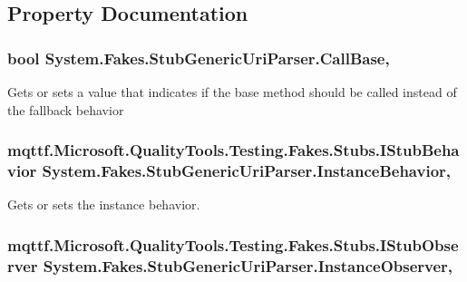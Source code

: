 \subsection{Property Documentation}
\hypertarget{class_system_1_1_fakes_1_1_stub_generic_uri_parser_a0331b76f773aca83c556dba9250e125d}{
\subsubsection[{Call\-Base}]{\setlength{\rightskip}{0pt plus 5cm}bool System.\-Fakes.\-Stub\-Generic\-Uri\-Parser.\-Call\-Base\hspace{0.3cm}{\ttfamily [get]}, {\ttfamily [set]}}}\label{class_system_1_1_fakes_1_1_stub_generic_uri_parser_a0331b76f773aca83c556dba9250e125d}


Gets or sets a value that indicates if the base method should be called instead of the fallback behavior

\hypertarget{class_system_1_1_fakes_1_1_stub_generic_uri_parser_a9869f7bc8bf42a907729a2815cfa8524}{
\subsubsection[{Instance\-Behavior}]{\setlength{\rightskip}{0pt plus 5cm}mqttf.\-Microsoft.\-Quality\-Tools.\-Testing.\-Fakes.\-Stubs.\-I\-Stub\-Behavior System.\-Fakes.\-Stub\-Generic\-Uri\-Parser.\-Instance\-Behavior\hspace{0.3cm}{\ttfamily [get]}, {\ttfamily [set]}}}\label{class_system_1_1_fakes_1_1_stub_generic_uri_parser_a9869f7bc8bf42a907729a2815cfa8524}


Gets or sets the instance behavior.

\hypertarget{class_system_1_1_fakes_1_1_stub_generic_uri_parser_a5939ff1dcadf8fc999d8d827e71765d2}{
\subsubsection[{Instance\-Observer}]{\setlength{\rightskip}{0pt plus 5cm}mqttf.\-Microsoft.\-Quality\-Tools.\-Testing.\-Fakes.\-Stubs.\-I\-Stub\-Observer System.\-Fakes.\-Stub\-Generic\-Uri\-Parser.\-Instance\-Observer\hspace{0.3cm}{\ttfamily [get]}, {\ttfamily [set]}}}\label{class_system_1_1_fakes_1_1_stub_generic_uri_parser_a5939ff1dcadf8fc999d8d827e71765d2}


